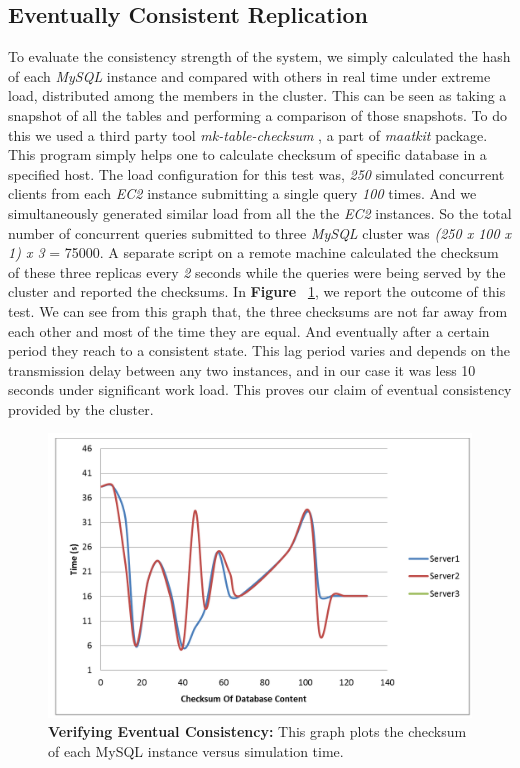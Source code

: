 \documentclass[12pt]{article}
\begin{document}
\subsection{Eventually Consistent Replication} To evaluate the
consistency strength of the system, we simply calculated the hash of each
\emph{MySQL} instance and compared with others in real time under extreme
load, distributed among the members in the cluster. This can be seen as taking a
snapshot of all the tables and performing a comparison of those snapshots. To do
this we used a third party tool \emph{mk-table-checksum} \cite{mk-table}, a part
of \emph{maatkit} \cite{maatkit} package. This program simply helps one to
calculate checksum of specific database in a specified host. The load
configuration for this test was, \emph{250} simulated concurrent clients from
each \emph{EC2} instance submitting a single query \emph{100} times. And we
simultaneously generated similar load from all the the \emph{EC2} instances. So
the total number of concurrent queries submitted to three \emph{MySQL} cluster
was \emph{(250 x 100 x 1) x 3} = 75000. A separate script on a remote machine
calculated the checksum of these three replicas every \emph{2} seconds while the
queries were being served by the cluster and reported the checksums. In
\textbf{Figure }~\ref{fig:consistency}, we report the outcome of this test. We
can see from this graph that, the three checksums are not far away from each
other and most of the time they are equal. And eventually after a certain period
they reach to a consistent state. This lag period varies and depends on the
transmission delay between any two instances, and in our case it was less 10
seconds under significant work load. This proves our claim of eventual
consistency provided by the cluster.  

\begin{figure}[H] 
\centering
\includegraphics[scale=0.35]{Images/graph_consistency.PNG}
\caption{\textbf{Verifying Eventual Consistency:} This 
graph plots the checksum of each MySQL instance versus simulation time.
}
\label{fig:consistency} 
\end{figure} 
\end{document}
